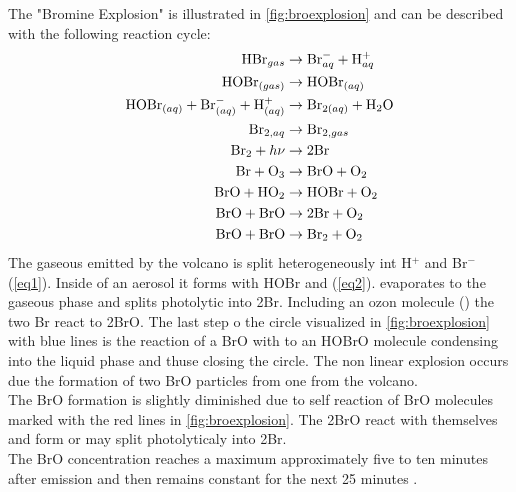 \documentclass  [
  paper    = a4,
  BCOR     = 10mm,
  twoside,
  fontsize = 12pt,
  fleqn,
  toc      = bibnumbered,
  toc      = listofnumbered,
  numbers  = noendperiod,
  headings = normal,
  listof   = leveldown,
  version  = 3.03
]                                       {scrreprt}
\begin{document}
The "Bromine Explosion" is illustrated in \cref{fig:broexplosion} and can be described with the following reaction cycle:
\begin{align}
\ce{HBr}_{gas} &\rightarrow \ce{Br}^{-}_{aq} + \ce{H}^{+}_{aq} \label{eq1}\\
\ce{HOBr}_{(gas)} &\rightarrow \ce{HOBr}_{(aq)} \\
\ce{HOBr}_{(aq)} + \ce{Br}^{-}_{(aq)} + \ce{H}^{+}_{(aq)} &\rightarrow
\ce{Br}_{2(aq)} +  \ce{H2O}\label{eq2}\\
\ce{Br}_{2,aq} &\rightarrow \ce{Br}_{2,gas} \\
\ce{Br2} + h\nu &\rightarrow 2 \ce{Br} \\
\ce{Br} + \ce{O3} &\rightarrow \ce{BrO} + \ce{O2} \\
\ce{BrO} + \ce{HO2} &\rightarrow \ce{HOBr} + \ce{O2} \\
\ce{BrO} + \ce{BrO} &\rightarrow 2 \ce{Br} + \ce{O2} \\
\ce{BrO} + \ce{BrO} &\rightarrow \ce{Br2} + \ce{O2}
\end{align}
The gaseous  emitted by the volcano is split heterogeneously int H$^{+}$ and Br$^{-}$ (\cref{eq1}). Inside of an aerosol it forms with HOBr  and  (\cref{eq2}).  evaporates to the gaseous phase and splits photolytic  into 2Br. Including an ozon molecule () the two Br react to 2BrO. The last step o the circle visualized in \cref{fig:broexplosion} with blue lines is the reaction of a BrO with  to an HOBrO molecule condensing into the liquid phase  and thuse closing the circle. The non linear explosion occurs due the formation of two BrO particles from one  from the volcano.\\
The BrO formation is slightly diminished due to self reaction of BrO molecules marked with the red lines in \cref{fig:broexplosion}. The 2BrO react with themselves and form  or may split photolyticaly into 2Br.\\
The BrO concentration reaches a maximum approximately five to ten minutes after emission and then remains constant for the next 25 minutes \citep{lubcke2014bro}.
\end{document}
